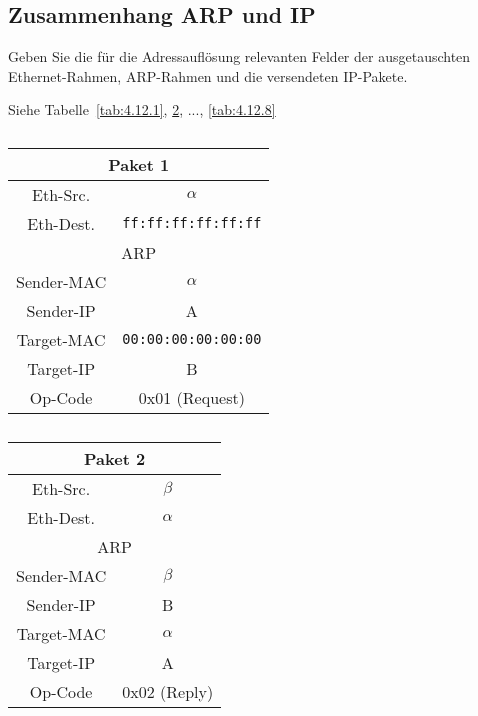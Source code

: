 \setcounter{section}{4}
\setcounter{subsection}{11} %
\subsection{Zusammenhang ARP und IP}

Geben Sie die für die Adressauflösung relevanten Felder der ausgetauschten
Ethernet-Rahmen, ARP-Rahmen und die versendeten IP-Pakete.

Siehe Tabelle~\ref{tab:4.12.1}, \ref{tab:4.12.2}, ..., \ref{tab:4.12.8}

\begin{table}[p]
    \begin{minipage}[t]{0.49\linewidth}
        \centering
        \begin{tabular}{|c|c|}
            \hline
            \multicolumn{2}{|c|}{Paket 1} \\
            \hline
            Eth-Src.  & $\alpha$ \\
            \hline
            Eth-Dest. & \verb|ff:ff:ff:ff:ff:ff| \\
            \hline
            \multicolumn{2}{|c|}{ARP} \\
            \hline
            Sender-MAC & $\alpha$ \\
            \hline
            Sender-IP & A \\
            \hline
            Target-MAC & \verb|00:00:00:00:00:00| \\
            \hline
            Target-IP & B \\
            \hline
            Op-Code & 0x01 (Request) \\
            \hline
        \end{tabular}
        \caption{}
        \label{tab:4.12.1}
    \end{minipage}
    \begin{minipage}[t]{0.49\linewidth}
        \centering
        \begin{tabular}{|c|c|}
            \hline
            \multicolumn{2}{|c|}{Paket 2} \\
            \hline
            Eth-Src.  & $\beta$ \\
            \hline
            Eth-Dest. & $\alpha$ \\
            \hline
            \multicolumn{2}{|c|}{ARP} \\
            \hline
            Sender-MAC & $\beta$ \\
            \hline
            Sender-IP & B \\
            \hline
            Target-MAC & $\alpha$ \\
            \hline
            Target-IP & A \\
            \hline
            Op-Code & 0x02 (Reply) \\
            \hline
        \end{tabular}
        \caption{}
        \label{tab:4.12.2}
    \end{minipage}
\end{table}

